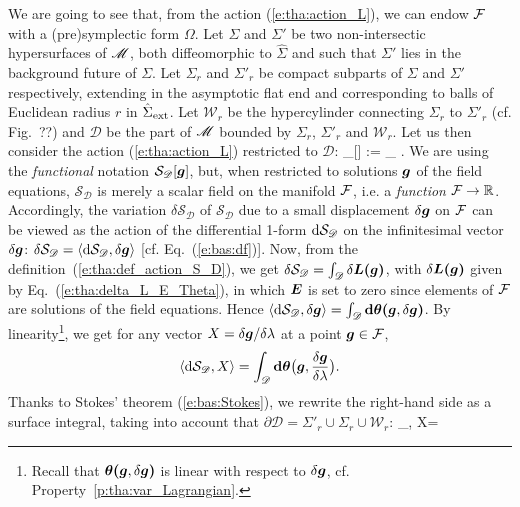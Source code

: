 We are going to see that, from the action (\ref{e:tha:action_L}),
we can endow $\mathcal{F}$ with a (pre)symplectic form $\Omega$.
Let
$\Sigma$ and $\Sigma'$ be two non-intersectic hypersurfaces of $\mathscr{M}$,
both diffeomorphic to $\hat{\Sigma}$ and such that $\Sigma'$ lies in the
background future of $\Sigma$. Let $\Sigma_r$ and $\Sigma'_r$
be compact subparts
of $\Sigma$ and $\Sigma'$ respectively,
extending in the asymptotic flat end and corresponding to balls of Euclidean radius $r$
in $\hat{\Sigma}_{\rm ext}$. Let $\mathscr{W}_r$
be the hypercylinder
connecting $\Sigma_r$ to $\Sigma'_r$ (cf. Fig.~??)
and $\mathscr{D}$ be the part
of $\mathscr{M}$ bounded by $\Sigma_r$, $\Sigma'_r$ and $\mathscr{W}_r$. Let us then consider the
action (\ref{e:tha:action_L}) restricted to $\mathscr{D}$:
\be \label{e:tha:def_action_S_D}
    _{}[] := \int_{} \lld{}\rld .
\ee
We are using the \emph{functional} notation $\mathcal{S}_{\mathscr{D}}[\bm{g}]$,
but, when restricted to solutions $\bm{g}$ of the field equations,
$\mathcal{S}_{\mathscr{D}}$ is merely a scalar field on the manifold $\mathcal{F}$,
i.e. a \emph{function} $\mathcal{F}\to \mathbb{R}$.
Accordingly, the variation $\delta\mathcal{S}_{\mathscr{D}}$ of $\mathcal{S}_{\mathscr{D}}$
due to a small displacement $\delta\bm{g}$ on $\mathcal{F}$ can be viewed
as the action of the differential 1-form $\mathrm{d} \mathcal{S}_{\mathscr{D}}$
on the infinitesimal vector $\delta\bm{g}$:
$\delta\mathcal{S}_{\mathscr{D}} =
\langle \mathrm{d} \mathcal{S}_{\mathscr{D}},\delta\bm{g}\rangle$
[cf. Eq.~(\ref{e:bas:df})]. Now, from the definition~(\ref{e:tha:def_action_S_D}),
we get $\delta\mathcal{S}_{\mathscr{D}} = \int_{\mathscr{D}} \delta \bm{L}\textbf{(}\bm{g}\textbf{)}$,
with $\delta\bm{L}\textbf{(}\bm{g}\textbf{)}$ given by Eq.~(\ref{e:tha:delta_L_E_Theta}),
in which $\bm{E}$ is set to zero since elements of $\mathcal{F}$ are solutions of the field equations.
Hence
$\langle \mathrm{d} \mathcal{S}_{\mathscr{D}},\delta\bm{g}\rangle =
\int_{\mathscr{D}} \mathbf{d} \bm{\theta}\textbf{(}\bm{g},\delta\bm{g}\textbf{)}$.
By linearity\footnote{Recall that $\bm{\theta}\textbf{(}\bm{g},\delta\bm{g}\textbf{)}$ is linear
with respect to $\delta\bm{g}$, cf. Property~\ref{p:tha:var_Lagrangian}.}, we get for any vector $X = \delta\bm{g}/\delta\lambda$ at a point $\bm{g}\in\mathcal{F}$,
\[
    \langle \mathrm{d} \mathcal{S}_{\mathscr{D}}, X\rangle =
\int_{\mathscr{D}} \mathbf{d} \bm{\theta}\bm{\big(}\bm{g},\frac{\delta\bm{g}}{\delta\lambda}\bm{\big)} .
\]
Thanks to Stokes' theorem (\ref{e:bas:Stokes}),
we rewrite the right-hand side as a surface integral, taking into
account that $\partial\mathscr{D} = \Sigma'_r \cup \Sigma_r \cup \mathscr{W}_r$:
\be \label{e:tha:dS_D_3int}
 \langle \Dd {}_{}, X\rangle =
